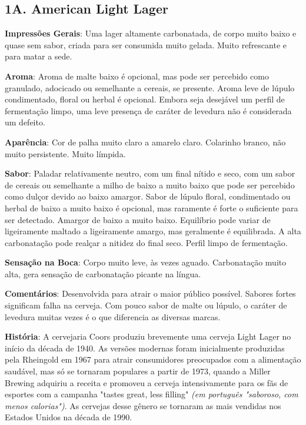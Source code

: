 \subsection*{1A. American Light Lager}
\textbf{Impressões Gerais}: Uma lager altamente carbonatada, de corpo muito baixo e quase sem sabor, criada para ser consumida muito gelada. Muito refrescante e para matar a sede.

\textbf{Aroma}: Aroma de malte baixo é opcional, mas pode ser percebido como granulado, adocicado ou semelhante a cereais, se presente. Aroma leve de lúpulo condimentado, floral ou herbal é opcional. Embora seja desejável um perfil de fermentação limpo, uma leve presença de caráter de levedura não é considerada um defeito.

\textbf{Aparência}: Cor de palha muito claro a amarelo claro. Colarinho branco, não muito persistente. Muito límpida.

\textbf{Sabor}: Paladar relativamente neutro, com um final nítido e seco, com um sabor de cereais ou semelhante a milho de baixo a muito baixo que pode ser percebido como dulçor devido ao baixo amargor. Sabor de lúpulo floral, condimentado ou herbal de baixo a muito baixo é opcional, mas raramente é forte o suficiente para ser detectado. Amargor de baixo a muito baixo. Equilíbrio pode variar de ligeiramente maltado a ligeiramente amargo, mas geralmente é equilibrada. A alta carbonatação pode realçar a nitidez do final seco. Perfil limpo de fermentação.

\textbf{Sensação na Boca}: Corpo muito leve, às vezes aguado. Carbonatação muito alta, gera sensação de carbonatação picante na língua.

\textbf{Comentários}: Desenvolvida para atrair o maior público possível. Sabores fortes significam falha na cerveja. Com pouco sabor de malte ou lúpulo, o caráter de levedura muitas vezes é o que diferencia as diversas marcas.

\textbf{História}: A cervejaria Coors produziu brevemente uma cerveja Light Lager no início da década de 1940. As versões modernas foram inicialmente produzidas pela Rheingold em 1967 para atrair consumidores preocupados com a alimentação saudável, mas só se tornaram populares a partir de 1973, quando a Miller Brewing adquiriu a receita e promoveu a cerveja intensivamente para os fãs de esportes com a campanha "tastes great, less filling" \textit{(em português "saboroso, com menos calorias")}. As cervejas desse gênero se tornaram as mais vendidas nos Estados Unidos na década de 1990.

